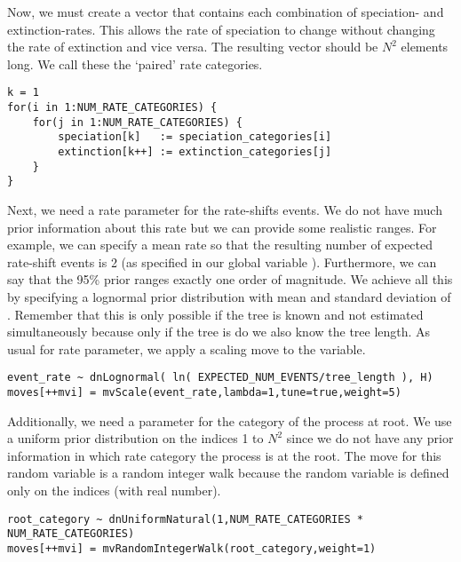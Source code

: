 Now, we must create a vector that contains each combination of speciation- and extinction-rates.
This allows the rate of speciation to change without changing the rate of extinction and vice versa.
The resulting vector should be $N^2$ elements long.
We call these the `paired' rate categories.

{\tt \begin{snugshade*}
\begin{lstlisting}
k = 1
for(i in 1:NUM_RATE_CATEGORIES) {
    for(j in 1:NUM_RATE_CATEGORIES) {
        speciation[k]   := speciation_categories[i]
        extinction[k++] := extinction_categories[j]
    }
}
\end{lstlisting}
\end{snugshade*}}


Next, we need a rate parameter for the rate-shifts events.
We do not have much prior information about this rate but we can provide some realistic ranges.
For example, we can specify a mean rate so that the resulting number of expected rate-shift events is 2 (as specified in our global variable ).
Furthermore, we can say that the 95\% prior ranges exactly one order of magnitude.
We achieve all this by specifying a lognormal prior distribution with mean  and standard deviation of .
Remember that this is only possible if the tree is known and not estimated simultaneously because only if the tree is do we also know the tree length.
As usual for rate parameter, we apply a scaling move to the  variable.
{\tt \begin{snugshade*}
\begin{lstlisting}
event_rate ~ dnLognormal( ln( EXPECTED_NUM_EVENTS/tree_length ), H)
moves[++mvi] = mvScale(event_rate,lambda=1,tune=true,weight=5)
\end{lstlisting}
\end{snugshade*}}

Additionally, we need a parameter for the category of the process at root.
We use a uniform prior distribution on the indices 1 to $N^2$ since we do not have any prior information in which rate category the process is at the root.
The move for this random variable is a random integer walk because the random variable is defined only on the indices (\CF with real number).
{\tt \begin{snugshade*}
\begin{lstlisting}
root_category ~ dnUniformNatural(1,NUM_RATE_CATEGORIES * NUM_RATE_CATEGORIES)
moves[++mvi] = mvRandomIntegerWalk(root_category,weight=1)
\end{lstlisting}
\end{snugshade*}}



